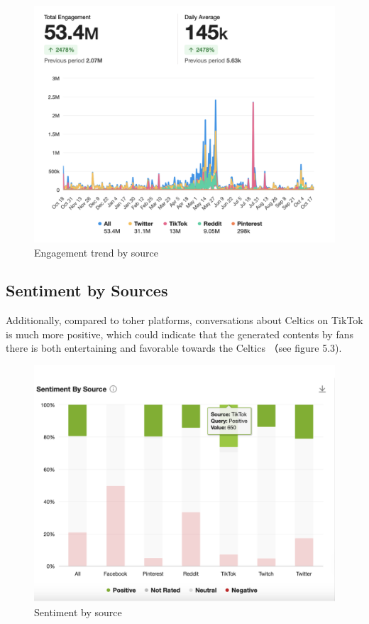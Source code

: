 \documentclass[
]{book}
\begin{document}
\begin{figure}
\centering
\includegraphics{2.png}
\caption{Engagement trend by source}
\end{figure}

\hypertarget{sentiment-by-sources}{%
\subsection{Sentiment by Sources}\label{sentiment-by-sources}}

Additionally, compared to toher platforms, conversations about Celtics on TikTok is much more positive, which could indicate that the generated contents by fans there is both entertaining and favorable towards the Celtics （see figure 5.3).

\begin{figure}
\centering
\includegraphics{3.png}
\caption{Sentiment by source}
\end{figure}
\end{document}
